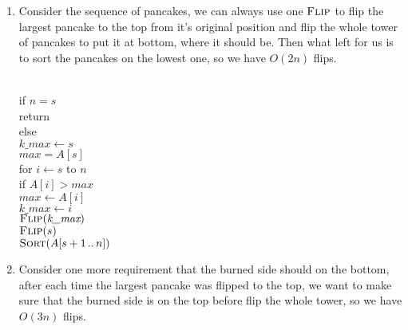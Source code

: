 \documentclass[11pt]{article}
\begin{document}
\begin{solution}
	\begin{enumerate}
		\item Consider the sequence of pancakes, we can always use one $\textsc{Flip}$ to flip the largest pancake to the top from it's original position and flip the whole tower of pancakes to put it at bottom, where it should be. Then what left for us is to sort the pancakes on the lowest one, so we have $O(2n)$ flips.
		\begin{center}
			\begin{algorithm}			
			\+
			\\ if $\textit{n} = s$\+
			\\	return\-
			\\ else\+
			\\ $\textit{k\_max} \gets s$
			\\ $\textit{max} = A[s]$
			\\ for $\textit{i} \gets s$ to $n$\+
			\\	if $A[\textit{i}] > \textit{max}$\+
			\\  	$\textit{max} \gets A[i]$
			\\		$\textit{k\_max} \gets i$\-\-
			\\ $\textsc{Flip}(\textit{k\_max})$
			\\ $\textsc{Flip}(s)$
			\\ $\textsc{Sort}(A[s + 1\,..\,n])$
			
		\end{algorithm}
		\end{center}
		
		\item Consider one more requirement that the burned side should on the bottom, after each time the largest pancake was flipped to the top, we want to make sure that the burned side is on the top before flip the whole tower, so we have $O(3n)$ flips.
		

\end{enumerate}
\end{solution}
\end{document}

